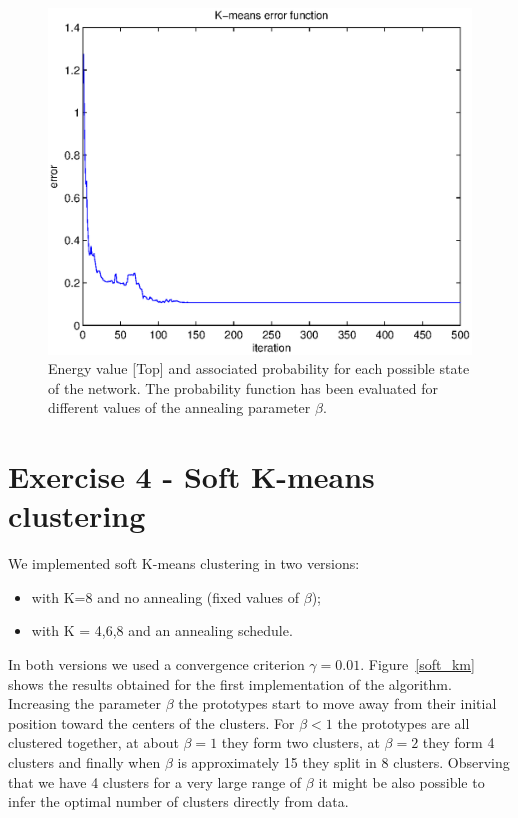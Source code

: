 \documentclass[a4paper,english]{article}
\begin{document}
\begin{figure}[h!]
\centering
\includegraphics[scale = 0.6]{ex3_kmeans_error}
\caption{Energy value [Top] and associated probability for each possible state of the network. The probability function has been evaluated for different values of the annealing parameter $\beta$.}
\label{km_err}
\end{figure}

\clearpage
\section*{Exercise 4 - Soft K-means clustering}
We implemented soft K-means clustering in two versions: 
\begin{itemize}
\item with K=8 and no annealing (fixed values of $\beta$);
\item with K = 4,6,8 and an annealing schedule.
\end{itemize}
In both versions we used a convergence criterion $\gamma = 0.01$.
Figure~\ref{soft_km} shows the results obtained for the first implementation of the algorithm. Increasing the parameter $\beta$ the prototypes start to move away from their initial position toward the  centers of the clusters. For $\beta < 1$ the prototypes are all clustered together, at about $\beta = 1$ they form two clusters, at $\beta = 2$ they form 4 clusters and finally when $\beta$ is approximately 15 they split in 8 clusters. Observing that we have 4 clusters for a very large range of $\beta$ it might be also possible to infer the optimal number of clusters directly from data.
 
\end{document}
